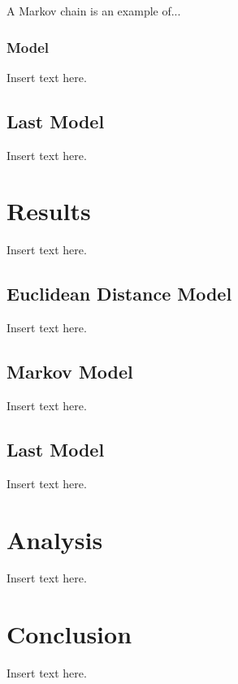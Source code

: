 \documentclass[twoside,twocolumn]{article}
\begin{document}
A Markov chain is an example of...

\subsubsection{Model}
Insert text here.
\subsection{Last Model} %
Insert text here.

\section{Results}
\label{sec:res}
Insert text here.
\subsection{Euclidean Distance Model}
Insert text here.
\subsection{Markov Model}
Insert text here.
\subsection{Last Model}
Insert text here.

\section{Analysis}
\label{sec:analysis}
Insert text here.

\section{Conclusion}
\label{sec:conclusion}
Insert text here.

\end{document}
